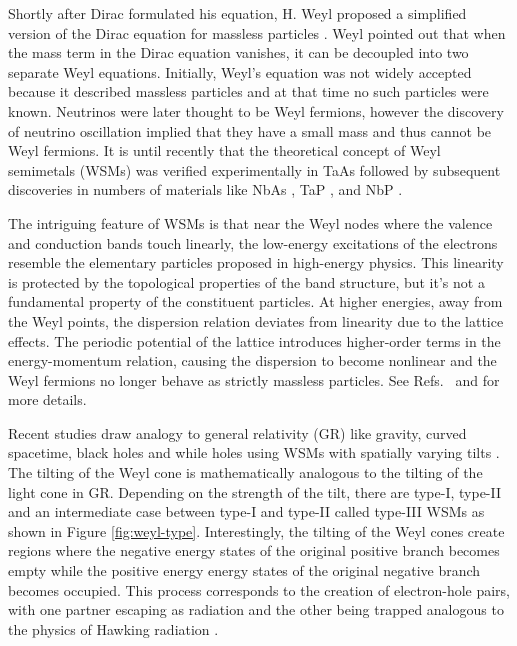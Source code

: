 \documentclass[%
 aip,
 amsmath,amssymb,
 reprint,%
]{revtex4-1}
\begin{document}
Shortly after Dirac formulated his equation, H. Weyl proposed a simplified version of the Dirac equation for massless particles \cite{weyl1929}. Weyl pointed out that when the mass term in the Dirac equation vanishes, it can be decoupled into two separate Weyl equations. Initially, Weyl’s equation was not widely accepted because it described massless particles and at that time no such particles were known. Neutrinos were later thought to be Weyl fermions, however the discovery of neutrino oscillation implied that they have a small mass \cite{fukuda1998,ahmad2002,eguchi2003} and thus cannot be Weyl fermions. It is until recently that the theoretical concept of Weyl semimetals (WSMs) was verified experimentally in TaAs \cite{lv2015a,lv2015b,xu2015a,yang2015} followed by subsequent discoveries in numbers of materials like NbAs \cite{xu2015b}, TaP \cite{xu2016}, and NbP \cite{shekhar2015}. 

The intriguing feature of WSMs is that near the Weyl nodes where the valence and conduction bands touch linearly, the low-energy excitations of the electrons resemble the elementary particles proposed in high-energy physics. This linearity is protected by the topological properties of the band structure, but it's not a fundamental property of the constituent particles. At higher energies, away from the Weyl points, the dispersion relation deviates from linearity due to the lattice effects. The periodic potential of the lattice introduces higher-order terms in the energy-momentum relation, causing the dispersion to become nonlinear and the Weyl fermions no longer behave as strictly massless particles. See Refs.~\cite{armitage2018} and \cite{rao2016} for more details.

Recent studies draw analogy to general relativity (GR) like gravity, curved spacetime, black holes and while holes using WSMs with spatially varying tilts \cite{haller2023,konye2022,konye2023,sabsovich2022}. The tilting of the Weyl cone is mathematically analogous to the tilting of the light cone in GR. Depending on the strength of the tilt, there are type-I, type-II \cite{soluyanov2015} and an intermediate case between type-I and type-II called type-III \cite{huang2018} WSMs as shown in Figure \ref{fig:weyl-type}. Interestingly, the tilting of the Weyl cones create regions where the negative energy states of the original positive branch becomes empty while the positive energy energy states of the original negative branch becomes occupied. This process corresponds to the creation of electron-hole pairs, with one partner escaping as radiation and the other being trapped analogous to the physics of Hawking radiation \cite{sabsovich2022,huang2018,volovik2016,de2021}.
\end{document}
